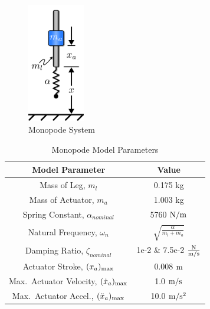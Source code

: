 \documentclass[10pt,twocolumn,letterpaper]{article}
\begin{document}
%
\begin{figure}[t]
        \begin{center}
        \includegraphics[width=2.5cm]{figures/Monopode_System/monoped.png}
        \caption{Monopode System}
        \label{fig:monopode} 
        \end{center}
        \end{figure}
\begin{table}[t]
        \caption{Monopode Model Parameters}
        \vspace{-4mm}
        \label{tab:monopode}
        \begin{center}
                \begin{tabular}{|c||c|}
                \hline
                \textbf{Model Parameter} & \textbf{Value}\\
                \hline
                Mass of Leg, $m_l$                                       & 0.175 kg                                          \\
                Mass of Actuator, $m_a$                                  & 1.003 kg                                          \\
                Spring Constant, $\alpha_{nominal}$                      & 5760 $\textup{N}/\textup{m}$                      \\
                Natural Frequency, $\omega_n$                            & $\sqrt{\frac{\alpha}{m_l + m_a}}$                 \\
                Damping Ratio, $\zeta_{nominal}$                         & 1e-2 \& 7.5e-2 $\frac{\textup{N}}{\textup{m/s}}$  \\
                \hline
                Actuator Stroke, $(x_{a})_{\textup{max}}$                & 0.008 $\textup{m}$                                \\
                Max.\ Actuator Velocity, $(\dot{x}_{a})_{\textup{max}}$  & 1.0 $\textup{m}/\textup{s}$                       \\ 
                Max.\ Actuator Accel., $(\ddot{x}_{a})_{\textup{max}}$   & 10.0 $\textup{m}/\textup{s}^2$                    \\
                \hline
                \end{tabular}
        \end{center}
\end{table}
\end{document}
